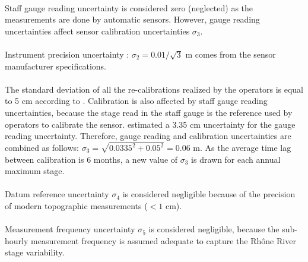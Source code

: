 \documentclass[11pt]{article}
\begin{document}
        \paragraph{}Staff gauge reading uncertainty is considered zero (neglected) as the measurements are done by automatic sensors. However, gauge reading uncertainties affect sensor calibration uncertainties $\sigma_3$. 
        
        \paragraph{}Instrument precision uncertainty : $\sigma_2 = 0.01/\sqrt{3}$ m comes from the sensor manufacturer specifications.
        
        \paragraph{}The standard deviation of all the re-calibrations realized by the operators is equal to 5 cm according to \citet{cetiat_conference_2005}. Calibration is also affected by staff gauge reading uncertainties, because the stage read in the staff gauge is the reference used by operators to calibrate the sensor. \citet{cetiat_conference_2005} estimated a 3.35 cm uncertainty for the gauge reading uncertainty. Therefore, gauge reading and calibration uncertainties are combined as follows: $\sigma_3 = \sqrt{0.0335^2 + 0.05^2} = 0.06$ m. As the average time lag between calibration is 6 months, a new value of $\sigma_3$ is drawn for each annual maximum stage. 
        
        \paragraph{}Datum reference uncertainty $\sigma_4$ is considered negligible because of the precision of modern topographic measurements ($<1$ cm).
        
        \paragraph{}Measurement frequency uncertainty $\sigma_5$ is considered negligible, because the sub-hourly measurement frequency is assumed adequate to capture the Rhône River stage variability. 
        
\end{document}
